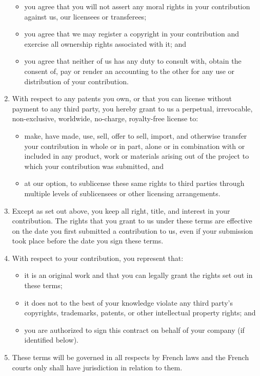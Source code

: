 \begin{enumerate}
\begin{itemize}
  \item you agree that you will not assert any moral rights in your
    contribution against us, our licensees or transferees;

  \item you agree that we may register a copyright in your contribution and
    exercise all ownership rights associated with it; and

  \item you agree that neither of us has any duty to consult with, obtain
    the consent of, pay or render an accounting to the other for any use or
    distribution of your contribution.
  \end{itemize}

\item With respect to any patents you own, or that you can license without
  payment to any third party, you hereby grant to us a perpetual,
  irrevocable, non-exclusive, worldwide, no-charge, royalty-free license to:

  \begin{itemize}
  \item make, have made, use, sell, offer to sell, import, and otherwise
    transfer your contribution in whole or in part, alone or in combination
    with or included in any product, work or materials arising out of the
    project to which your contribution was submitted, and

  \item at our option, to sublicense these same rights to third parties
    through multiple levels of sublicensees or other licensing arrangements.
  \end{itemize}

\item Except as set out above, you keep all right, title, and interest in
  your contribution. The rights that you grant to us under these terms are
  effective on the date you first submitted a contribution to us, even if
  your submission took place before the date you sign these terms.

\item With respect to your contribution, you represent that:
  \begin{itemize}
  \item it is an original work and that you can legally grant the rights set
    out in these terms;

  \item it does not to the best of your knowledge violate any third party's
    copyrights, trademarks, patents, or other intellectual property rights;
    and

  \item you are authorized to sign this contract on behalf of your company
    (if identified below).
  \end{itemize}

\item These terms will be governed in all respects by French laws and the
  French courts only shall have jurisdiction in relation to them.
\end{enumerate}

